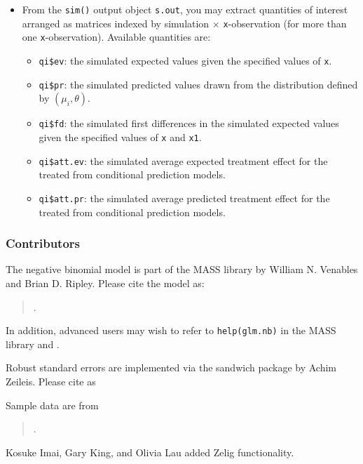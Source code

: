 \begin{itemize}
\item From the {\tt sim()} output object {\tt s.out}, you may extract
  quantities of interest arranged as matrices indexed by simulation
  $\times$ {\tt x}-observation (for more than one {\tt x}-observation).
  Available quantities are:

   \begin{itemize}
   \item {\tt qi\$ev}: the simulated expected values given the specified
     values of {\tt x}.
   \item {\tt qi\$pr}: the simulated predicted values drawn from the
     distribution defined by $(\mu_i, \theta)$.  
   \item {\tt qi\$fd}: the simulated first differences in the
     simulated expected values given the specified values of {\tt x}
     and {\tt x1}.
   \item {\tt qi\$att.ev}: the simulated average expected treatment
     effect for the treated from conditional prediction models.  
   \item {\tt qi\$att.pr}: the simulated average predicted treatment
     effect for the treated from conditional prediction models.  
   \end{itemize}
\end{itemize}

\subsubsection{Contributors}

The negative binomial model is part of the MASS library by William N.
Venables and Brian D. Ripley.  Please cite the model as:
\begin{verse}
.
\end{verse}

In addition, advanced users may wish to refer to {\tt help(glm.nb)} in
the MASS library and \cite{McCNel89}.

Robust standard errors are implemented via the sandwich package
by Achim Zeileis.  Please cite as
\begin{verse}
\end{verse}

Sample data are from 
\begin{verse}
.
\end{verse}

Kosuke Imai, Gary King, and Olivia Lau added Zelig functionality.  








